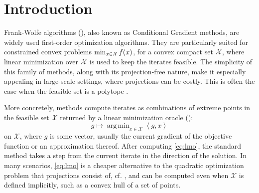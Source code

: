 \documentclass[twoside]{article}
\newcommand{\mP}{\mathcal{P}}
\newcommand{\mQ}{\mathcal{Q}}
\newcommand{\mX}{\mathcal{X}}
\newcommand{\innp}[1]{\left\langle #1 \right\rangle}
\DeclareMathOperator*{\argmin}{\mathrm{arg\,min}}
\let\epsilon\varepsilon
\begin{document}


\section{Introduction}\label{s:intro}

Frank-Wolfe algorithms (), also known as Conditional Gradient methods, are widely used first-order optimization algorithms. They are particularly suited for constrained convex problems $\min_{x\in\mathcal{X}} f(x)$, for a convex compact set $\mathcal{X}$, where linear minimization over $\mathcal{X}$ is used to keep the iterates feasible. The simplicity of this family of methods, along with its projection-free nature, make it especially appealing in large-scale settings, where projections can be costly. This is often the case when the feasible set is a polytope \citep{BCC+23}.

More concretely, \FW{} methods compute iterates as combinations of extreme points in the feasible set $\mX$ returned by a linear minimization oracle ():
\begin{equation}
g \mapsto \argmin_{x \in \mX} \innp{g, x} \tag{LMO}
\label{eq:lmo}
\end{equation}
on $\mX$, where $g$ is some vector, usually the current gradient of the objective function or an approximation thereof.
After computing \eqref{eq:lmo}, the standard \FW{} method takes a step from the current iterate in the direction of the \LMO{} solution.
In many scenarios, \eqref{eq:lmo}
is a cheaper alternative to the quadratic optimization problem that projections consist of, cf. \citep{Jag13}, and can be computed even when $\mX$ is defined implicitly, such as a convex hull of a set of points.
\end{document}

